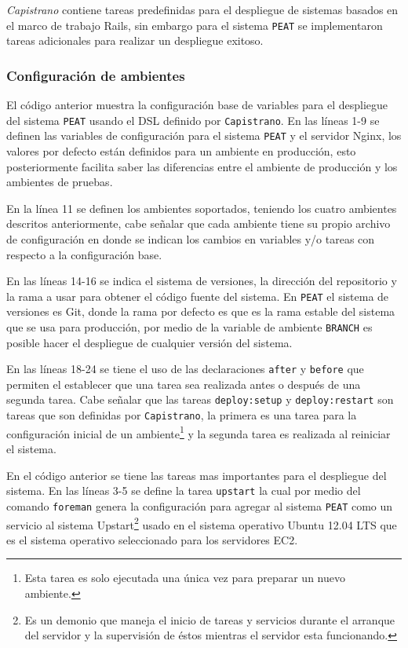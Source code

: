 \textit{Capistrano} contiene tareas predefinidas para el despliegue de sistemas
basados en el marco de trabajo Rails, sin embargo para el sistema \texttt{PEAT} se
implementaron tareas adicionales para realizar un despliegue exitoso.

\subsubsection{Configuración de ambientes}



El código anterior muestra la configuración base de variables para el
despliegue del sistema \texttt{PEAT} usando el DSL definido por \texttt{Capistrano}.
En las líneas 1-9 se definen las variables de configuración para el sistema
\texttt{PEAT} y el servidor Nginx, los valores por defecto están definidos
para un ambiente en producción, esto posteriormente facilita saber las diferencias
entre el ambiente de producción y los ambientes de pruebas.

En la línea 11 se definen los ambientes soportados, teniendo los cuatro
ambientes descritos anteriormente, cabe señalar que cada ambiente tiene
su propio archivo de configuración en donde se indican los cambios en variables
y/o tareas con respecto a la configuración base.

En las líneas 14-16 se indica el sistema de versiones, la dirección del repositorio
y la rama a usar para obtener el código fuente del sistema.
En \texttt{PEAT} el sistema de versiones es Git, donde la rama por defecto
es  que es la rama estable del sistema que
se usa para producción, por medio de la variable de ambiente \texttt{BRANCH} es
posible hacer el despliegue de cualquier versión del sistema.

En las líneas 18-24 se tiene el uso de las declaraciones \texttt{after}
y \texttt{before} que permiten el establecer que una tarea sea realizada
antes o después de una segunda tarea. Cabe señalar que las tareas
\texttt{deploy:setup} y \texttt{deploy:restart} son tareas que son definidas
por \texttt{Capistrano}, la primera es una tarea para la configuración inicial
de un ambiente\footnote{Esta tarea es solo ejecutada una única vez para preparar
  un nuevo ambiente.} y la segunda tarea es realizada al reiniciar el sistema.



En el código anterior se tiene las tareas mas importantes para el
despliegue del sistema. En las líneas 3-5 se define la tarea \texttt{upstart}
la cual por medio del comando \texttt{foreman} genera la configuración para agregar
al sistema \texttt{PEAT} como un servicio al sistema Upstart\footnote{Es un demonio
  que maneja el inicio de tareas y servicios durante el arranque del servidor y la
  supervisión de éstos mientras el servidor esta funcionando.} usado en el sistema
operativo Ubuntu 12.04 LTS que es el sistema operativo seleccionado para los
servidores EC2.

